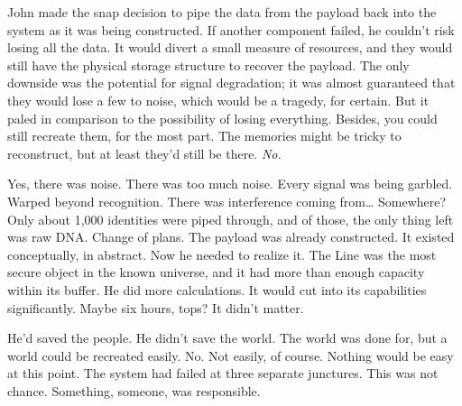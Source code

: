 John made the snap decision to pipe the data from the payload back into the system as it was being constructed. If another component failed, he couldn’t risk losing all the data. It would divert a small measure of resources, and they would still have the physical storage structure to recover the payload.  The only downside was the potential for signal degradation; it was almost guaranteed that they would lose a few to noise, which would be a tragedy, for certain. But it paled in comparison to the possibility of losing everything. Besides, you could still recreate them, for the most part. The memories might be tricky to reconstruct, but at least they’d still be there.
\SomeVSpace
\emph{No.}\par
\SomeVSpace
Yes, there was noise. There was too much noise. Every signal was being garbled. Warped beyond recognition. There was interference coming from… Somewhere? Only about 1,000 identities were piped through, and of those, the only thing left was raw DNA.  Change of plans.
\SomeVSpace
The payload was already constructed. It existed conceptually, in abstract. Now he needed to realize it. The Line was the most secure object in the known universe, and it had more than enough capacity within its buffer. He did more calculations. It would cut into its capabilities significantly. Maybe six hours, tops? It didn’t matter.

He’d saved the people. He didn’t save the world. The world was done for, but a world could be recreated easily. No. Not easily, of course. Nothing would be easy at this point. The system had failed at three separate junctures. This was not chance. Something, someone, was responsible.

